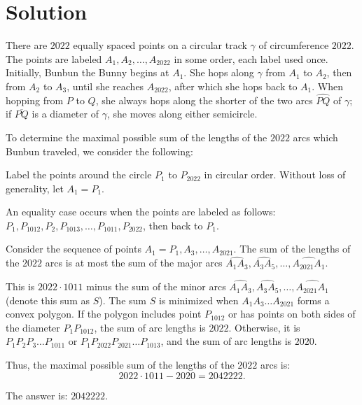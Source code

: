 \documentclass[12pt]{article}
\begin{document}
\section*{Solution}

There are \(2022\) equally spaced points on a circular track \(\gamma\) of circumference \(2022\).
The points are labeled \(A_1, A_2, \ldots, A_{2022}\) in some order, each label used once.
Initially, Bunbun the Bunny begins at \(A_1\).
She hops along \(\gamma\) from \(A_1\) to \(A_2\), then from \(A_2\) to \(A_3\), until she reaches \(A_{2022}\),
after which she hops back to \(A_1\).
When hopping from \(P\) to \(Q\), she always hops along the shorter of the two arcs \(\widehat{PQ}\) of \(\gamma\);
if \(\overline{PQ}\) is a diameter of \(\gamma\), she moves along either semicircle.

To determine the maximal possible sum of the lengths of the \(2022\) arcs which Bunbun traveled, we consider the following:

Label the points around the circle \(P_1\) to \(P_{2022}\) in circular order. Without loss of generality, let \(A_1 = P_1\).

An equality case occurs when the points are labeled as follows:
\(P_1, P_{1012}, P_2, P_{1013}, \ldots, P_{1011}, P_{2022}\), then back to \(P_1\).

Consider the sequence of points \(A_1 = P_1, A_3, \ldots, A_{2021}\).
The sum of the lengths of the \(2022\) arcs is at most the sum of the major arcs
\(\widehat{A_1A_3}, \widehat{A_3A_5}, \ldots, \widehat{A_{2021}A_1}\).

This is \(2022 \cdot 1011\) minus the sum of the minor arcs
\(\widehat{A_1A_3}, \widehat{A_3A_5}, \ldots, \widehat{A_{2021}A_1}\) (denote this sum as \(S\)).
The sum \(S\) is minimized when \(A_1A_3 \ldots A_{2021}\) forms a convex polygon.
If the polygon includes point \(P_{1012}\) or has points on both sides of the diameter \(P_1P_{1012}\),
the sum of arc lengths is \(2022\). Otherwise, it is
\(P_1P_2P_3 \ldots P_{1011}\) or \(P_1P_{2022}P_{2021} \ldots P_{1013}\),
and the sum of arc lengths is \(2020\).

Thus, the maximal possible sum of the lengths of the \(2022\) arcs is:
\[
2022 \cdot 1011 - 2020 = 2042222.
\]

The answer is: \(\boxed{2042222}\).
\end{document}
